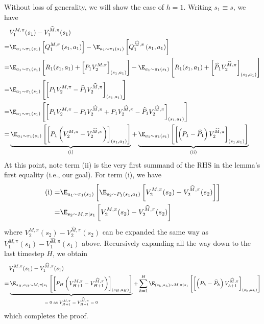 Without loss of generality, we will show the case of $h=1$.
Writing $s_1\equiv s$, we have
\begin{align*}
&V_1^{M, \pi}(s_1)-V_1^{\widehat{M}, \pi}(s_1)\\
=& \E_{a_1 \sim \pi_1(s_1)}\left[Q_1^{M, \pi}\left(s_1, a_1\right)\right]-\E_{a_1 \sim \pi_1(s_1)}\left[Q_1^{\widehat{M}, \pi}\left(s_1, a_1\right)\right]\\
=& \E_{a_1 \sim \pi_1(s_1)}\left[R_1(s_1, a_1)+\left[P_1 V_2^{M, \pi}\right]_{(s_1, a_1)}\right]-\E_{a_1 \sim \pi_1(s_1)}\left[R_1(s_1, a_1)+\left[\widehat{P}_1 V_2^{\widehat{M}, \pi}\right]_{(s_1, a_1)}\right]\\
=&\E_{a_1 \sim \pi_1(s_1)}\left[\left[P_1 V_2^{M, \pi}-\widehat{P}_1 V_2^{\widehat{M}, \pi}\right]_{\left(s_1, a_1\right)}\right]\\
=&\E_{a_1 \sim \pi_1(s_1)}\left[\left[P_1 V_2^{M, \pi}-P_1 V_2^{\widehat{M}, \pi}+P_1 V_2^{\widehat{M}, \pi}-\widehat{P}_1 V_2^{\widehat{M}, \pi}\right]_{\left(s_1, a_1\right)}\right]\\
=&\underbrace{\E_{a_1 \sim \pi_1(s_1)}\left[\left[P_1 \left(V_2^{M, \pi}-V_2^{\widehat{M}, \pi}\right)\right]_{\left(s_1, a_1\right)}\right]}_{\rm (i)} + \underbrace{\E_{a_1 \sim \pi_1(s_1)}\left[\left[\left(P_1 -\widehat{P}_1\right) V_2^{\widehat{M}, \pi}\right]_{\left(s_1, a_1\right)}\right]}_{\rm (ii)}
\end{align*}
At this point, note term (ii) is the very first summand of the RHS in the lemma's first equality (i.e., our goal).
For term (i), we have
\begin{align*}
    {\rm (i)} =& \E_{a_1 \sim \pi_1(s_1)}\left[\E_{s_2\sim P_1(s_1,a_1)}\left[V_2^{M, \pi}(s_2)-V_2^{\widehat{M}, \pi}(s_2)\right]\right]\\
    =& \E_{s_2\sim M, \pi | s_1} \left[V_2^{M, \pi}(s_2)-V_2^{\widehat{M}, \pi}(s_2)\right]
\end{align*}
where $V_2^{M, \pi}(s_2)-V_2^{\widehat{M}, \pi}(s_2)$ can be expanded the same way as $V_1^{M, \pi}(s_1)-V_1^{\widehat{M}, \pi}(s_1)$ above.
Recursively expanding all the way down to the last timestep $H$, we obtain 
\begin{align*}
    &V_1^{M, \pi}(s_1)-V_1^{\widehat{M}, \pi}(s_1) \\
    =& \underbrace{\E_{s_H, a_H \sim M, \pi | s_1}\left[\left[P_H \left(V_{H+1}^{M, \pi}-V_{H+1}^{\widehat{M}, \pi}\right)\right]_{\left(s_H, a_H\right)}\right]}_{\text{$=0$ as $V_{H+1}^{M, \pi}=V_{H+1}^{\widehat{M}, \pi}=0$}}
    + \sum_{h=1}^H \E_{\left(s_h, a_h\right) \sim M, \pi | s_1}\left[\left[\left(P_h-\widehat{P}_h\right) V_{h+1}^{\widehat{M}, \pi}\right]_{(s_h,a_h)}\right]
\end{align*}
which completes the proof.







